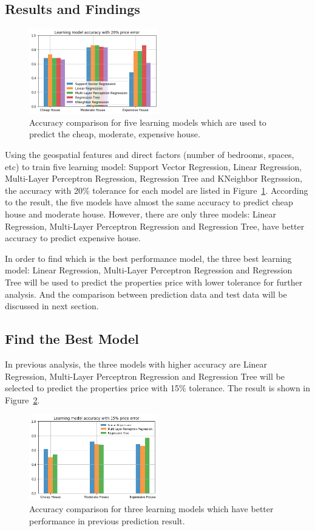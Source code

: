 \documentclass[11pt,a4paper]{article}
\begin{document}
\subsection{Results and Findings}

\begin{figure}[h]
\includegraphics[width=0.5\textwidth]{result-data/tolerance20.png}
\caption{Accuracy comparison for five learning models which are used to predict the cheap, moderate, expensive house.}
\label{fig:tolerance20}
\centering
\end{figure}
Using the geospatial features and direct factors (number of bedrooms, spaces, etc) to train five learning model: Support Vector Regression, Linear Regression, Multi-Layer Perceptron Regression, Regression Tree and KNeighbor Regrsssion, the accuracy with 20\% tolerance for each model are listed in Figure~\ref{fig:tolerance20}. According to the result, the five models have almost the same accuracy to predict cheap house and moderate house. However, there are only three models: Linear Regression, Multi-Layer Perceptron Regression and Regression Tree, have better accuracy to predict expensive house. 

In order to find which is the best performance model, the three best learning model: Linear Regression, Multi-Layer Perceptron Regression and Regression Tree will be used to predict the properties price with lower tolerance for further analysis. And the comparison between prediction data and test data will be discussed in next section.


\FloatBarrier
\subsection{Find the Best Model}
In previous analysis, the three models with higher accuracy are Linear Regression, Multi-Layer Perceptron Regression and Regression Tree will be selected to predict the properties price with 15\% tolerance. The result is shown in Figure~\ref{fig:tolerance15}. 
\begin{figure}[h]
\includegraphics[width=0.5\textwidth]{result-data/tolerance15.png}
\caption{Accuracy comparison for three learning models which have better performance in previous prediction result.}
\label{fig:tolerance15}
\centering
\end{figure}
\end{document}
